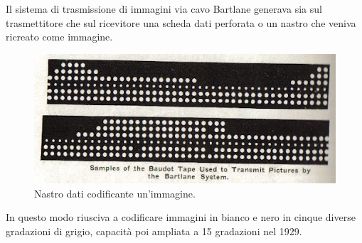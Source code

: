 \noindent Il sistema di trasmissione di immagini via cavo Bartlane generava sia sul trasmettitore che sul ricevitore una scheda dati perforata o un nastro che veniva ricreato come immagine.

\begin{figure}[htb] \centering
\includegraphics[scale=0.7, trim = 0 1.1cm 0 0, clip]{Pictures/nastro Bartlane.jpg}
\caption{Nastro dati codificante un'immagine.}\label{fig:figura}
\end{figure}

\noindent
In questo modo riusciva a codificare immagini in bianco e nero in cinque diverse gradazioni di grigio, capacità poi ampliata a 15 gradazioni nel 1929.

